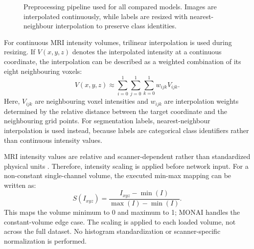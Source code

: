 \begin{figure}[hbt!]
\centering
{}
\caption{Preprocessing pipeline used for all compared models. Images are interpolated continuously, while labels are resized with nearest-neighbour interpolation to preserve class identities.}
\label{fig:preprocessing_pipeline}
\end{figure}

For continuous MRI intensity volumes, trilinear interpolation is used during resizing. If $V(x,y,z)$ denotes the interpolated intensity at a continuous coordinate, the interpolation can be described as a weighted combination of its eight neighbouring voxels:
\begin{equation}
    V(x,y,z) \approx \sum_{i=0}^{1}\sum_{j=0}^{1}\sum_{k=0}^{1} w_{ijk}V_{ijk}.
\end{equation}
Here, $V_{ijk}$ are neighbouring voxel intensities and $w_{ijk}$ are interpolation weights determined by the relative distance between the target coordinate and the neighbouring grid points. For segmentation labels, nearest-neighbour interpolation is used instead, because labels are categorical class identifiers rather than continuous intensity values.

MRI intensity values are relative and scanner-dependent rather than standardized physical units \citep{nyul1999on}. Therefore, intensity scaling is applied before network input. For a non-constant single-channel volume, the executed min-max mapping can be written as:
\begin{equation}
    S(I_{xyz}) = \frac{I_{xyz}-\min(I)}{\max(I)-\min(I)}.
\end{equation}
This maps the volume minimum to 0 and maximum to 1; MONAI handles the constant-volume edge case. The scaling is applied to each loaded volume, not across the full dataset. No histogram standardization or scanner-specific normalization is performed.

